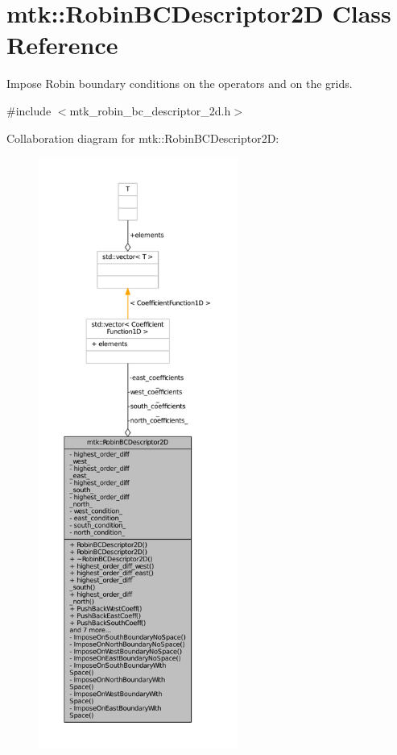 \hypertarget{classmtk_1_1RobinBCDescriptor2D}{\section{mtk\+:\+:Robin\+B\+C\+Descriptor2\+D Class Reference}
\label{classmtk_1_1RobinBCDescriptor2D}
}


Impose Robin boundary conditions on the operators and on the grids.  




{\ttfamily \#include $<$mtk\+\_\+robin\+\_\+bc\+\_\+descriptor\+\_\+2d.\+h$>$}



Collaboration diagram for mtk\+:\+:Robin\+B\+C\+Descriptor2\+D\+:
\nopagebreak
\begin{figure}[H]
\begin{center}
\leavevmode
\includegraphics[height=550pt]{classmtk_1_1RobinBCDescriptor2D__coll__graph}
\end{center}
\end{figure}
